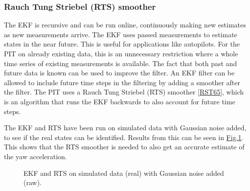 \documentclass[review]{elsarticle}
\begin{document}
\subsubsection{Rauch Tung Striebel (RTS) smoother}
\label{\detokenize{04.01_EK:rauch-tung-striebel-rts-smoother}}\label{\detokenize{04.01_EK:rts}}
\sphinxAtStartPar
The EKF is recursive and can be run online, continuously making new estimates as new measurements arrive. The EKF uses passed measurements to estimate states in the near future. This is useful for applications like autopilots. For the PIT on already existing data, this is an unnecessary restriction where a whole time series of existing measurements is available. The fact that both past and future data is known can be used to improve the filter. An EKF filter can be allowed to include future time steps in the filtering by adding a smoother after the filter. The PIT uses a Rauch Tung Striebel (RTS) smoother {[}\hyperlink{cite.bibligraphy:id67}{RST65}{]}, which is an algorithm that runs the EKF backwards to also account for future time steps.

\sphinxAtStartPar
The EKF and RTS have been run on simulated data with Gaussian noise added, to see if the real states can be identified. Results from this can be seen in  \hyperref[\detokenize{04.01_EK:fig-ekf}]{Fig.\@ \ref{\detokenize{04.01_EK:fig-ekf}}}. This shows that the RTS smoother is needed to also get an accurate estimate of the yaw acceleration.

\begin{figure}[H]
\centering
\capstart

\noindent{}
\caption{EKF and RTS on simulated data (real) with Gaussian noise added (raw).}\label{\detokenize{04.01_EK:fig-ekf}}\end{figure}
\end{document}
